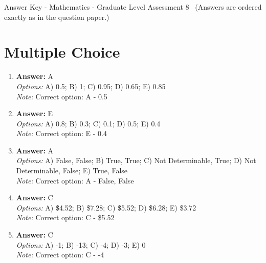 \documentclass[12pt]{article}
\begin{document}
\begin{center}
Answer Key - Mathematics - Graduate Level Assessment 8 \
\small (Answers are ordered exactly as in the question paper.)
\end{center}

\section*{Multiple Choice}
\begin{enumerate}[label=\arabic*.]
\item \textbf{Answer:} A
\\ \textit{Options:} A) 0.5; B) 1; C) 0.95; D) 0.65; E) 0.85
\\ \textit{Note:} Correct option: A - 0.5
\item \textbf{Answer:} E
\\ \textit{Options:} A) 0.8; B) 0.3; C) 0.1; D) 0.5; E) 0.4
\\ \textit{Note:} Correct option: E - 0.4
\item \textbf{Answer:} A
\\ \textit{Options:} A) False, False; B) True, True; C) Not Determinable, True; D) Not Determinable, False; E) True, False
\\ \textit{Note:} Correct option: A - False, False
\item \textbf{Answer:} C
\\ \textit{Options:} A) \$4.52; B) \$7.28; C) \$5.52; D) \$6.28; E) \$3.72
\\ \textit{Note:} Correct option: C - \$5.52
\item \textbf{Answer:} C
\\ \textit{Options:} A) -1; B) -13; C) -4; D) -3; E) 0
\\ \textit{Note:} Correct option: C - -4
\end{enumerate}
\end{document}

